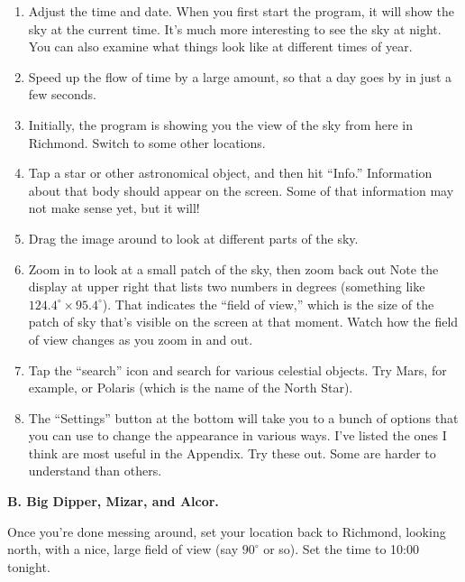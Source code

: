\begin{enumerate}
\item Adjust the time and date. When you first start the 
program, it will show the sky at the current time.  It's much
more interesting to see the sky at night. You can
also examine what things look like at different times of year.

\item Speed up the flow of time by a large amount, so that
a day goes by in just a few seconds.

\item Initially, the program is showing you the view of the sky
from here in Richmond. Switch to some other locations.

\item Tap a star or other astronomical object, and then hit ``Info.''
Information about that body should appear on the screen.
Some of that information may not make sense yet, but it will!

\item Drag the image around 
to look at different parts 
of the sky.

\item Zoom in to look at a small patch of the sky, then
zoom back out
Note the display at upper right that lists two numbers in 
degrees (something like $124.4^\circ \times 95.4^\circ$).
That indicates the 
``field of view,'' which is the size of the patch of sky
that's visible on the screen at that moment. Watch how the field of
view changes as you zoom in and out.

\item Tap the ``search'' icon and search for various celestial
objects. 
Try Mars, for example, or Polaris (which
is the name of the North Star).


\item The ``Settings'' button at the bottom will take you to a
bunch of options that you can use to change the appearance in
various ways.
I've listed the ones I think
are most useful in the Appendix. Try these out. Some are harder
to understand than others.

\end{enumerate}

\bigskip

{\bf B. Big Dipper, Mizar, and Alcor.}

Once you're done messing around, set your location back to Richmond,
looking north, with a nice, large field of view (say $90^\circ$ or so).
Set the
time to 10:00 tonight.

